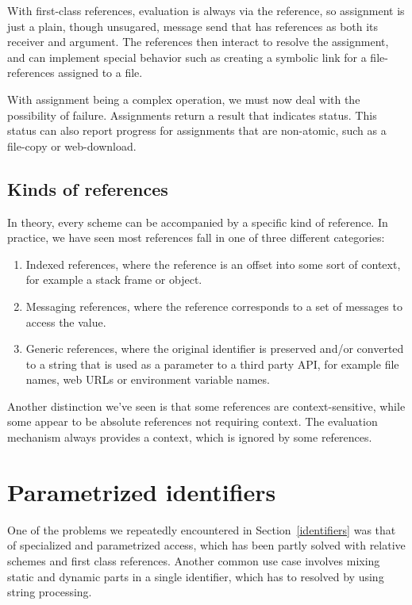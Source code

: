 \documentclass{acm_proc_article-sp}
\begin{document}
With first-class references, evaluation is always via the reference, so assignment is just a plain, though unsugared,
message send that has references as both its receiver and argument.  The references then interact to resolve
the assignment, and can implement special behavior such as creating a symbolic link for a file-references assigned
to a file.

With assignment being a complex operation, we must now deal with the possibility of failure.  Assignments 
return a result that indicates status.  This status can also report progress for assignments that are
non-atomic, such as a file-copy or web-download.



\subsection{Kinds of references}
\label{refkinds}
In theory, every scheme can be accompanied by a specific kind of reference.  In practice, we have 
seen most references fall in one of three different categories:

\begin{enumerate}
\item Indexed references, where the reference is an offset into some sort of context, for
	example a stack frame or object.
\item Messaging references, where the reference corresponds to a set of messages to
	access the value.
\item Generic references, where the original identifier is preserved and/or converted to
	a string that is used as a parameter to a third party API, for example file names,
	web URLs or environment variable names.
\end{enumerate}

Another distinction we've seen is that some references are context-sensitive, while some
appear to be absolute references not requiring context.  The evaluation mechanism always
provides a context, which is ignored by some references.  


\section{Parametrized identifiers}
\label{parametrized}

One of the problems we repeatedly encountered in Section~\ref{identifiers} was 
that of specialized and parametrized access, which has been partly solved with
relative schemes and first class references.  Another common use case involves
mixing static and dynamic parts in a single identifier, which has to resolved by
using string processing.
\end{document}
